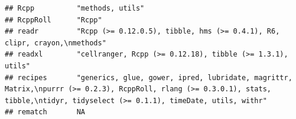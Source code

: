 \documentclass[]{article}
\begin{document}
\begin{verbatim}
## Rcpp          "methods, utils"                                                                                                                                                                                                                                                                                                                                                                                                                                                                      
## RcppRoll      "Rcpp"                                                                                                                                                                                                                                                                                                                                                                                                                                                                                
## readr         "Rcpp (>= 0.12.0.5), tibble, hms (>= 0.4.1), R6, clipr, crayon,\nmethods"                                                                                                                                                                                                                                                                                                                                                                                                             
## readxl        "cellranger, Rcpp (>= 0.12.18), tibble (>= 1.3.1), utils"                                                                                                                                                                                                                                                                                                                                                                                                                             
## recipes       "generics, glue, gower, ipred, lubridate, magrittr, Matrix,\npurrr (>= 0.2.3), RcppRoll, rlang (>= 0.3.0.1), stats, tibble,\ntidyr, tidyselect (>= 0.1.1), timeDate, utils, withr"                                                                                                                                                                                                                                                                                                    
## rematch       NA                                                                                                                                                                                                                                                                                                                                                                                                                                                                                    

\end{verbatim}
\end{document}

